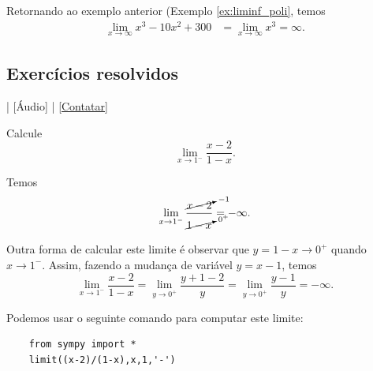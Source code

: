 \begin{ex}
  Retornando ao exemplo anterior (Exemplo \ref{ex:liminf_poli}, temos
  \begin{align}
    \lim_{x\to \infty} x^3 - 10x^2 + 300 &= \lim_{x\to \infty} x^3 = \infty.
  \end{align}
\end{ex}

\subsection*{Exercícios resolvidos}

\begin{flushright}
  [Vídeo] | [Áudio] | \href{https://phkonzen.github.io/notas/contato.html}{[Contatar]}
\end{flushright}

\begin{exeresol}
  Calcule
  \begin{equation}
    \lim_{x\to 1^-} \frac{x-2}{1-x}. 
  \end{equation}
\end{exeresol}
\begin{resol}
  Temos
  \begin{align}
    \lim_{x\to 1^-} \frac{\cancelto{-1}{x-2}}{\cancelto{0^+}{1-x}} = -\infty.
  \end{align}

  Outra forma de calcular este limite é observar que $y = 1-x\to 0^+$ quando $x\to 1^-$. Assim, fazendo a mudança de variável $y = x-1$, temos
  \begin{equation}
    \lim_{x\to 1^-} \frac{x-2}{1-x} = \lim_{y\to 0^+} \frac{y+1-2}{y} = \lim_{y\to 0^+} \frac{y-1}{y} = -\infty.
  \end{equation}

  \ifispython
  Podemos usar o seguinte comando {\sympy} para computar este limite:
  \begin{lstlisting}
    from sympy import *
    limit((x-2)/(1-x),x,1,'-')
  \end{lstlisting}
  \fi
\end{resol}

